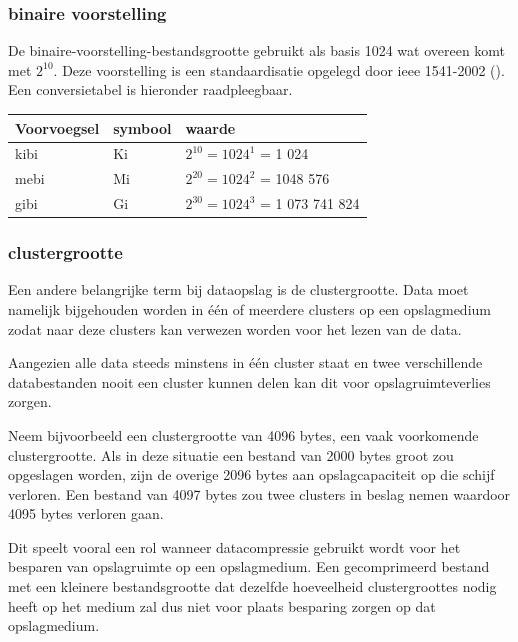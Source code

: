 \subsubsection{binaire voorstelling}
\label{sec:bestandsgrootte-dataopslag-voorvoegsels-binair}

De \gls{binaire-voorstelling-bestandsgrootte} gebruikt als basis 1024 wat overeen komt met $ 2^{10} $. Deze voorstelling is een standaardisatie opgelegd door \gls{ieee} 1541-2002 (\cite{ieee15412002}). Een conversietabel is hieronder raadpleegbaar.

\FloatBarrier
\begin{table}[h]
	\begin{tabular}{|l|l|l|}
		\hline
		\textbf{Voorvoegsel} & \textbf{symbool} & \textbf{waarde} \\ \hline
		kibi & Ki & $ 2^{10} = 1024^{1} $  = 1 024 \\ \hline
		mebi & Mi & $ 2^{20} = 1024^{2} $ = 1048 576 \\ \hline
		gibi & Gi & $ 2^{30} = 1024^{3} $ = 1 073 741 824 \\ \hline
	\end{tabular}
\end{table}
\FloatBarrier

\subsubsection{clustergrootte}
\label{sec:bestandsgrootte-dataopslag-clustergrootte}

Een andere belangrijke term bij dataopslag is de \gls{clustergrootte}. Data moet namelijk bijgehouden worden in één of meerdere \glspl{cluster} op een opslagmedium zodat naar deze \glspl{cluster} kan verwezen worden voor het lezen van de data. 

Aangezien alle data steeds minstens in één \gls{cluster} staat en twee verschillende databestanden nooit een \gls{cluster} kunnen delen kan dit voor opslagruimteverlies zorgen. 

Neem bijvoorbeeld een \gls{clustergrootte} van 4096 \glspl{byte}, een vaak voorkomende \gls{clustergrootte}. Als in deze situatie een bestand van 2000 \glspl{byte} groot zou opgeslagen worden, zijn de overige 2096 \glspl{byte} aan opslagcapaciteit op die schijf verloren. Een bestand van 4097 \glspl{byte} zou twee \glspl{cluster} in beslag nemen waardoor 4095 \glspl{byte} verloren gaan. 

Dit speelt vooral een rol wanneer \gls{datacompressie} gebruikt wordt voor het besparen van opslagruimte op een opslagmedium. Een gecomprimeerd bestand met een kleinere bestandsgrootte dat dezelfde hoeveelheid \glspl{clustergrootte} nodig heeft op het medium zal dus niet voor plaats besparing zorgen op dat opslagmedium. 

